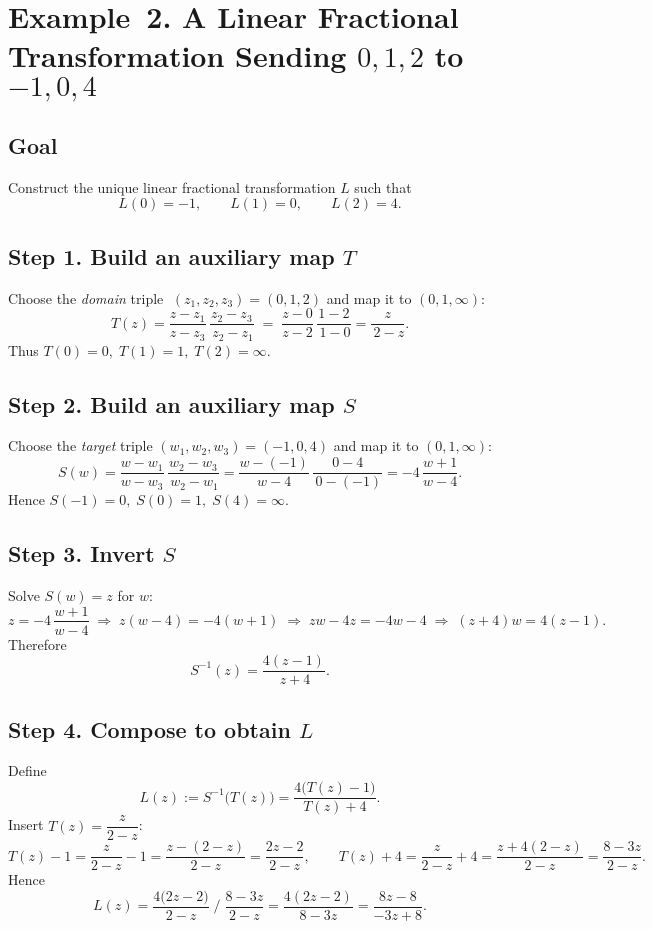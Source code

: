 \documentclass[12pt]{article}
\theoremstyle{definition} %
\theoremstyle{plain} %
\begin{document}
\section*{Example 2.  A Linear Fractional Transformation Sending $0,1,2$ to $-1,0,4$}

\subsection*{Goal}
Construct the unique linear fractional transformation \(L\) such that
\[
    L(0)=-1,\qquad
    L(1)=0,\qquad
    L(2)=4 .
\]

\subsection*{Step 1.  Build an auxiliary map \(T\)}
Choose the \emph{domain} triple
\(\;(z_{1},z_{2},z_{3})=(0,1,2)\) and map it to \((0,1,\infty)\):  
\[
   T(z)=
      \frac{z-z_{1}}{z-z_{3}}\,
      \frac{z_{2}-z_{3}}{\,z_{2}-z_{1}}
      \;=\;
      \frac{z-0}{z-2}\,
      \frac{1-2}{\,1-0}
      =
      \frac{z}{\,2-z}.
\]
Thus
\(
    T(0)=0,\;
    T(1)=1,\;
    T(2)=\infty.
\)

\subsection*{Step 2.  Build an auxiliary map \(S\)}
Choose the \emph{target} triple
\((w_{1},w_{2},w_{3})=(-1,0,4)\) and map it to \((0,1,\infty)\):  
\[
   S(w)=
      \frac{w-w_{1}}{w-w_{3}}\,
      \frac{w_{2}-w_{3}}{\,w_{2}-w_{1}}
      =
      \frac{w-(-1)}{w-4}\,
      \frac{0-4}{\,0-(-1)}
      =
      -4\,\frac{w+1}{w-4}.
\]
Hence
\(
    S(-1)=0,\;
    S(0)=1,\;
    S(4)=\infty.
\)

\subsection*{Step 3.  Invert \(S\)}
Solve \(S(w)=z\) for \(w\):
\[
   z=-4\,\frac{w+1}{w-4}
   \;\Longrightarrow\;
   z(w-4)=-4(w+1)
   \;\Longrightarrow\;
   zw-4z=-4w-4
   \;\Longrightarrow\;
   (z+4)w=4(z-1).
\]
Therefore
\[
   S^{-1}(z)=\frac{4(z-1)}{\,z+4}.
\]

\subsection*{Step 4.  Compose to obtain \(L\)}
Define
\[
   L(z):=S^{-1}\!\bigl(T(z)\bigr)
        =\frac{4\bigl(T(z)-1\bigr)}{T(z)+4}.
\]
Insert \(T(z)=\dfrac{z}{2-z}\):
\[
   T(z)-1=\frac{z}{2-z}-1=\frac{z-(2-z)}{2-z}=\frac{2z-2}{2-z},\qquad
   T(z)+4=\frac{z}{2-z}+4=\frac{z+4(2-z)}{2-z}=\frac{8-3z}{2-z}.
\]
Hence
\[
   L(z)=
   \frac{4\bigl(2z-2\bigr)}{2-z}\;
   \Big/\;
   \frac{8-3z}{2-z}
   =\frac{4(2z-2)}{8-3z}
   =\frac{8z-8}{-3z+8}.
\]
\end{document}
